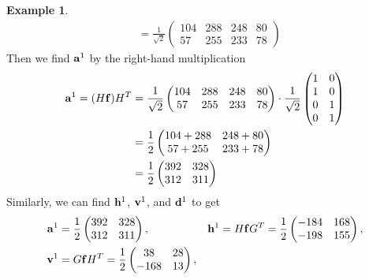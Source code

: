 \documentclass[12pt]{article}
\theoremstyle{definition}
\newtheorem{example}[definition]{Example}
\begin{document}
\begin{example}
\begin{align*}
      &= \frac{1}{\sqrt{2}}
      \begin{pmatrix}
        104 & 288 & 248 & 80 \\
        57 & 255 & 233 & 78
      \end{pmatrix}
    \end{align*}
    Then we find \(\vb{a}^1\) by the right-hand multiplication
    \begin{align*} %
      \vb{a}^1 = (H \vb{f}) H^T &= \frac{1}{\sqrt{2}}
      \begin{pmatrix}
        104 & 288 & 248 & 80 \\
        57 & 255 & 233 & 78
      \end{pmatrix}
      \cdot \frac{1}{\sqrt{2}}
      \begin{pmatrix}
        1 & 0\\
        1 & 0\\
        0 & 1\\
        0 & 1
      \end{pmatrix}\\
      &= \frac{1}{2}
      \begin{pmatrix}
        104 + 288 & 248 + 80 \\
        57 + 255 & 233 + 78
      \end{pmatrix}\\
      &= \frac{1}{2}
      \begin{pmatrix}
        392 & 328\\
        312 & 311
      \end{pmatrix}
    \end{align*}
    Similarly, we can find \(\vb{h}^1\), \(\vb{v}^1\), and \(\vb{d}^1\) to get
    \begin{align*}
      \vb{a}^1 &=
      \frac{1}{2}
      \begin{pmatrix}
        392 & 328\\
        312 & 311
      \end{pmatrix},&
      \vb{h}^1 &= H\vb{f}G^T
      = \frac{1}{2}
      \begin{pmatrix}
        -184 & 168 \\
        -198 & 155
      \end{pmatrix},\\
      \vb{v}^1 &= G\vb{f}H^T
      = \frac{1}{2}
      \begin{pmatrix}
          38 & 28 \\
        -168 & 13
      \end{pmatrix},&

\end{align*}
\end{example}
\end{document}
